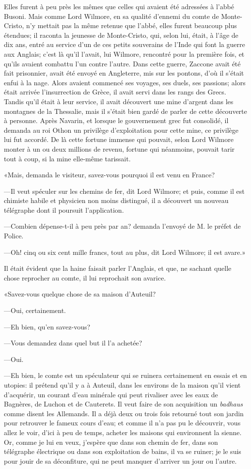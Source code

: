 Elles furent à peu près les mêmes que celles qui avaient été adressées à l'abbé Busoni. Mais comme Lord Wilmore, en sa qualité d'ennemi du comte de Monte-Cristo, n'y mettait pas la même retenue que l'abbé, elles furent beaucoup plus étendues; il raconta la jeunesse de Monte-Cristo, qui, selon lui, était, à l'âge de dix ans, entré au service d'un de ces petits souverains de l'Inde qui font la guerre aux Anglais; c'est là qu'il l'avait, lui Wilmore, rencontré pour la première fois, et qu'ils avaient combattu l'un contre l'autre. Dans cette guerre, Zaccone avait été fait prisonnier, avait été envoyé en Angleterre, mis sur les pontons, d'où il s'était enfui à la nage. Alors avaient commencé ses voyages, ses duels, ses passions; alors était arrivée l'insurrection de Grèce, il avait servi dans les rangs des Grecs. Tandis qu'il était à leur service, il avait découvert une mine d'argent dans les montagnes de la Thessalie, mais il s'était bien gardé de parler de cette découverte à personne. Après Navarin, et lorsque le gouvernement grec fut consolidé, il demanda au roi Othon un privilège d'exploitation pour cette mine, ce privilège lui fut accordé. De là cette fortune immense qui pouvait, selon Lord Wilmore monter à un ou deux millions de revenu, fortune qui néanmoins, pouvait tarir tout à coup, si la mine elle-même tarissait. 

«Mais, demanda le visiteur, savez-vous pourquoi il est venu en France? 

—Il veut spéculer sur les chemins de fer, dit Lord Wilmore; et puis, comme il est chimiste habile et physicien non moins distingué, il a découvert un nouveau télégraphe dont il poursuit l'application. 

—Combien dépense-t-il à peu près par an? demanda l'envoyé de M. le préfet de Police. 

—Oh! cinq ou six cent mille francs, tout au plus, dit Lord Wilmore; il est avare.» 

Il était évident que la haine faisait parler l'Anglais, et que, ne sachant quelle chose reprocher au comte, il lui reprochait son avarice. 

«Savez-vous quelque chose de sa maison d'Auteuil? 

—Oui, certainement. 

—Eh bien, qu'en savez-vous? 

—Vous demandez dans quel but il l'a achetée? 

—Oui. 

—Eh bien, le comte est un spéculateur qui se ruinera certainement en essais et en utopies: il prétend qu'il y a à Auteuil, dans les environs de la maison qu'il vient d'acquérir, un courant d'eau minérale qui peut rivaliser avec les eaux de Bagnères, de Luchon et de Cauterets. Il veut faire de son acquisition un \textit{badhaus} comme disent les Allemands. Il a déjà deux ou trois fois retourné tout son jardin pour retrouver le fameux cours d'eau; et comme il n'a pas pu le découvrir, vous allez le voir, d'ici à peu de temps, acheter les maisons qui environnent la sienne. Or, comme je lui en veux, j'espère que dans son chemin de fer, dans son télégraphe électrique ou dans son exploitation de bains, il va se ruiner; je le suis pour jouir de sa déconfiture, qui ne peut manquer d'arriver un jour ou l'autre. 

